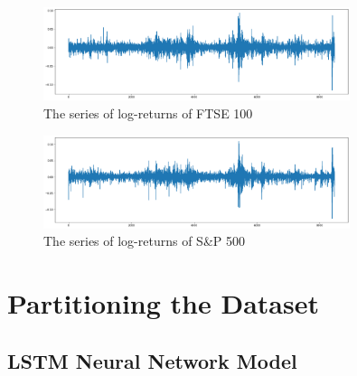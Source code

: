 \documentclass[a4paper,11pt,oneside]{book}
\begin{document}
\begin{figure}[!h]
	\centering
	\includegraphics[width=0.8\textwidth]{figures/logFTSE}
	\caption{The series of log-returns of FTSE 100}
	\label{logFTSE}
\end{figure}


\begin{figure}[!h]
	\centering
	\includegraphics[width=0.8\textwidth]{figures/logS&P500}
	\caption{The series of log-returns of S\&P 500}
	\label{logSandP 500}
\end{figure}

\section{Partitioning the Dataset}
\subsection{LSTM Neural Network Model}
\end{document}
